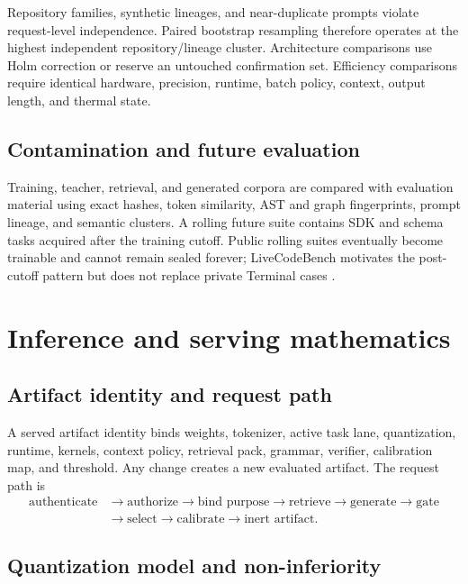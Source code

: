 \documentclass[10pt,letterpaper]{article}
\newcommand{\1}{\mathbb{1}}
\begin{document}
Repository families, synthetic lineages, and near-duplicate prompts violate request-level
independence.  Paired bootstrap resampling therefore operates at the highest independent
repository/lineage cluster.  Architecture comparisons use Holm correction or reserve an untouched
confirmation set.  Efficiency comparisons require identical hardware, precision, runtime, batch
policy, context, output length, and thermal state.

\subsection{Contamination and future evaluation}

Training, teacher, retrieval, and generated corpora are compared with evaluation material using exact
hashes, token similarity, AST and graph fingerprints, prompt lineage, and semantic clusters.  A
rolling future suite contains SDK and schema tasks acquired after the training cutoff.  Public rolling
suites eventually become trainable and cannot remain sealed forever; LiveCodeBench motivates the
post-cutoff pattern but does not replace private Terminal cases \cite{jain2024livecodebench}.

\section{Inference and serving mathematics}

\subsection{Artifact identity and request path}

A served artifact identity binds weights, tokenizer, active task lane, quantization, runtime, kernels,
context policy, retrieval pack, grammar, verifier, calibration map, and threshold.  Any change creates
a new evaluated artifact.  The request path is
\begin{equation}
  \begin{aligned}
    \text{authenticate}&\rightarrow\text{authorize}\rightarrow\text{bind purpose}
      \rightarrow\text{retrieve}\rightarrow\text{generate}\rightarrow\text{gate}\\
    &\rightarrow\text{select}\rightarrow\text{calibrate}\rightarrow\text{inert artifact}.
  \end{aligned}
\end{equation}

\subsection{Quantization model and non-inferiority}
\end{document}
